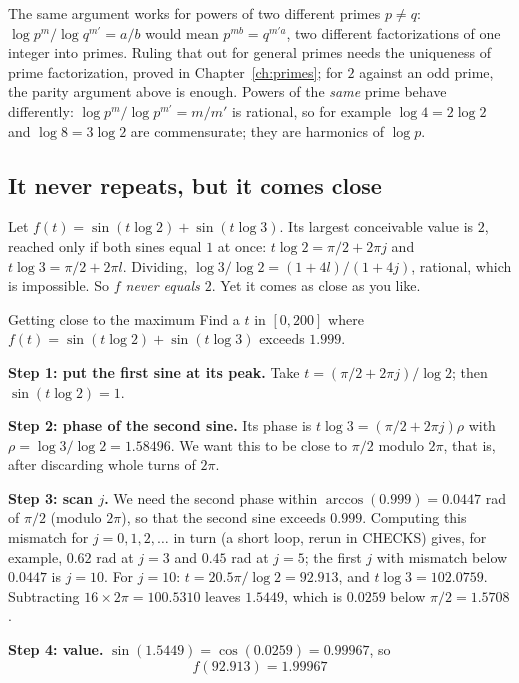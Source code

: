 The same argument works for powers of two different primes $p\neq q$: $\log p^m/\log q^{m'}=a/b$ would mean $p^{mb}=q^{m'a}$, two different factorizations of one integer into primes. Ruling that out for general primes needs the uniqueness of prime factorization, proved in Chapter~\ref{ch:primes}; for $2$ against an odd prime, the parity argument above is enough. Powers of the \emph{same} prime behave differently: $\log p^m/\log p^{m'}=m/m'$ is rational, so for example $\log4=2\log2$ and $\log8=3\log2$ are commensurate; they are harmonics of $\log p$.

\subsection{It never repeats, but it comes close}

Let $f(t)=\sin(t\log2)+\sin(t\log3)$. Its largest conceivable value is $2$, reached only if both sines equal $1$ at once: $t\log2=\pi/2+2\pi j$ and $t\log3=\pi/2+2\pi l$. Dividing, $\log3/\log2=(1+4l)/(1+4j)$, rational, which is impossible. So \emph{$f$ never equals $2$}. Yet it comes as close as you like.

\begin{sample}{Getting close to the maximum}
Find a $t$ in $[0,200]$ where $f(t)=\sin(t\log2)+\sin(t\log3)$ exceeds $1.999$.

\textbf{Step 1: put the first sine at its peak.} Take $t=(\pi/2+2\pi j)/\log2$; then $\sin(t\log2)=1$.

\textbf{Step 2: phase of the second sine.} Its phase is $t\log3=(\pi/2+2\pi j)\rho$ with $\rho=\log3/\log2=1.58496$. We want this to be close to $\pi/2$ modulo $2\pi$, that is, after discarding whole turns of $2\pi$.

\textbf{Step 3: scan $j$.} We need the second phase within $\arccos(0.999)=0.0447$ rad of $\pi/2$ (modulo $2\pi$), so that the second sine exceeds $0.999$. Computing this mismatch for $j=0,1,2,\dots$ in turn (a short loop, rerun in CHECKS) gives, for example, $0.62$ rad at $j=3$ and $0.45$ rad at $j=5$; the first $j$ with mismatch below $0.0447$ is $j=10$. For $j=10$: $t=20.5\pi/\log 2=92.913$, and $t\log3=102.0759$. Subtracting $16\times2\pi=100.5310$ leaves $1.5449$, which is $0.0259$ below $\pi/2=1.5708$.

\textbf{Step 4: value.} $\sin(1.5449)=\cos(0.0259)=0.99967$, so
\[
\boxed{f(92.913)=1.99967}
\]
\end{sample}

